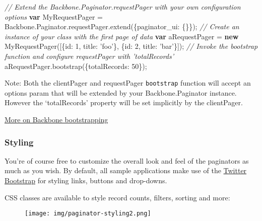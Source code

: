 \documentclass[9pt]{book}
\newenvironment{Shaded}{}{}
\newcommand{\KeywordTok}[1]{\textcolor[rgb]{0.00,0.44,0.13}{\textbf{{#1}}}}
\newcommand{\DataTypeTok}[1]{\textcolor[rgb]{0.56,0.13,0.00}{{#1}}}
\newcommand{\DecValTok}[1]{\textcolor[rgb]{0.25,0.63,0.44}{{#1}}}
\newcommand{\StringTok}[1]{\textcolor[rgb]{0.25,0.44,0.63}{{#1}}}
\newcommand{\CommentTok}[1]{\textcolor[rgb]{0.38,0.63,0.69}{\textit{{#1}}}}
\newcommand{\OtherTok}[1]{\textcolor[rgb]{0.00,0.44,0.13}{{#1}}}
\newcommand{\FunctionTok}[1]{\textcolor[rgb]{0.02,0.16,0.49}{{#1}}}
\newcommand{\NormalTok}[1]{{#1}}
\begin{document}
\begin{Shaded}
\begin{Highlighting}[]

\CommentTok{// Extend the Backbone.Paginator.requestPager with your own configuration options}
\KeywordTok{var} \NormalTok{MyRequestPager =  }\OtherTok{Backbone}\NormalTok{.}\OtherTok{Paginator}\NormalTok{.}\OtherTok{requestPager}\NormalTok{.}\FunctionTok{extend}\NormalTok{(\{}\DataTypeTok{paginator_ui}\NormalTok{: \{\}\});}
\CommentTok{// Create an instance of your class with the first page of data}
\KeywordTok{var} \NormalTok{aRequestPager = }\KeywordTok{new} \FunctionTok{MyRequestPager}\NormalTok{([\{}\DataTypeTok{id}\NormalTok{: }\DecValTok{1}\NormalTok{, }\DataTypeTok{title}\NormalTok{: }\StringTok{'foo'}\NormalTok{\}, \{}\DataTypeTok{id}\NormalTok{: }\DecValTok{2}\NormalTok{, }\DataTypeTok{title}\NormalTok{: }\StringTok{'bar'}\NormalTok{\}]);}
\CommentTok{// Invoke the bootstrap function and configure requestPager with 'totalRecords'}
\OtherTok{aRequestPager}\NormalTok{.}\FunctionTok{bootstrap}\NormalTok{(\{}\DataTypeTok{totalRecords}\NormalTok{: }\DecValTok{50}\NormalTok{\});}
\end{Highlighting}
\end{Shaded}

Note: Both the clientPager and requestPager \texttt{bootstrap} function
will accept an options param that will be extended by your
Backbone.Paginator instance. However the `totalRecords' property will be
set implicitly by the clientPager.

\href{http://ricostacruz.com/backbone-patterns/\#bootstrapping_data}{More
on Backbone bootstrapping}

\subsubsection{Styling}\label{styling}

You're of course free to customize the overall look and feel of the
paginators as much as you wish. By default, all sample applications make
use of the \href{http://twitter.github.com/bootstrap}{Twitter Bootstrap}
for styling links, buttons and drop-downs.

CSS classes are available to style record counts, filters, sorting and
more:

\begin{figure}[htbp]
\centering
\texttt{[image: img/paginator-styling2.png]}
\end{figure}
\end{document}
